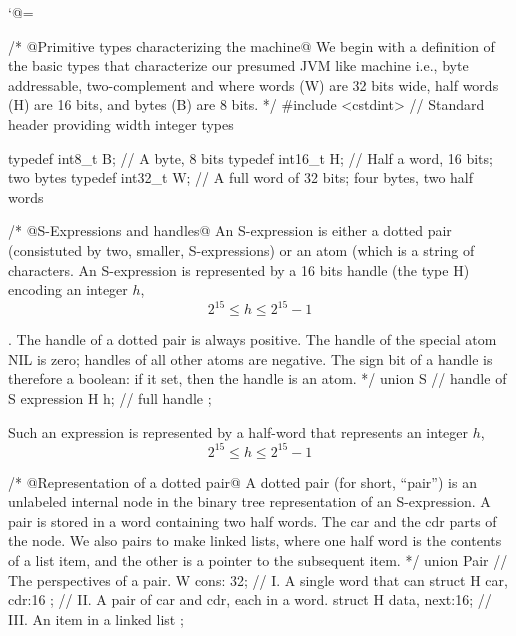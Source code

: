 \documentclass[12pt]{article}
\newcounter{segment}
\begin{document}
\begingroup
\catcode`@=\active
\gdef\works{%
  \catcode`@=\active
  \def@##1@{%
        \noindent\textbf{\refstepcounter{segment}\arabic{segment}.~##1.}%
  }%
}%
\endgroup
\begin{code}/* @Primitive types characterizing the machine@ We begin with a %
definition  of the basic types that characterize our presumed JVM like machine 
i.e., byte addressable, two-complement and where words (W) are 32 bits wide, 
half words (H) are 16 bits, and bytes (B) are 8 bits. */
#include <cstdint> // Standard header providing width integer types 

typedef int8_t  B; // A byte, 8 bits 
typedef int16_t H; // Half a word, 16 bits; two bytes
typedef int32_t W; // A full word of 32 bits; four bytes, two half words
\end{code}

\begin{code}
/* @S-Expressions and  handles@ An S-expression is either a  dotted pair 
(consistuted by two, smaller, S-expressions) or an atom (which is a string of 
characters.  An S-expression is represented by a 16 bits handle (the 
type H) encoding an integer $h$,
\[2^{15} \le h \le 2^{15}-1\] 

. The handle of a dotted pair is always positive. The handle of the 
special atom  NIL is zero; handles of all other atoms are negative. The sign bit 
of a handle is therefore 
a boolean: if it set, then the handle is an atom.
*/
union S { // handle of S expression
  H h; // full handle
  };
\end{code}

Such an expression is represented by a half-word that represents an integer $h$, %
\[2^{15} \le h \le 2^{15}-1\] 

\begin{code}/* @Representation of a dotted pair@ A dotted pair (for short, ``pair'') is 
an unlabeled internal node in the binary tree representation of an S-expression. 
A pair is stored in a word containing two half words. The car and the cdr parts 
of the node. We also pairs to make linked lists, where one half word is the
contents of a list item, and the other is a pointer to the subsequent item.
*/
union Pair { // The perspectives of a pair.
  W cons: 32;                   // I. A single word that can 
  struct { H car, cdr:16 };    // II. A pair of car and cdr, each in a word.
  struct { H data, next:16};   // III. An item in a linked list
};
\end{code}
\end{document}
